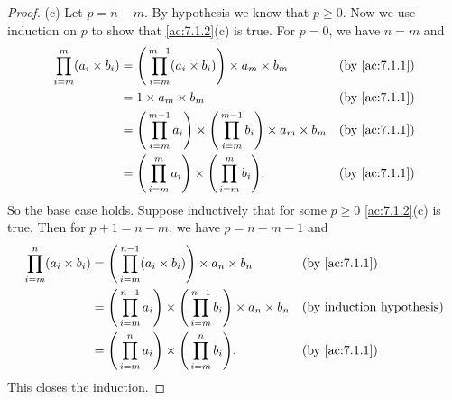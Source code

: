 \begin{proof}{(c)}
  Let \(p = n - m\).
  By hypothesis we know that \(p \geq 0\).
  Now we use induction on \(p\) to show that \cref{ac:7.1.2}(c) is true.
  For \(p = 0\), we have \(n = m\) and
  \begin{align*}
    \prod_{i = m}^m (a_i \times b_i) & = \Bigg(\prod_{i = m}^{m - 1} (a_i \times b_i)\Bigg) \times a_m \times b_m                                 &  & \text{(by \cref{ac:7.1.1})} \\
                                     & = 1 \times a_m \times b_m                                                                                  &  & \text{(by \cref{ac:7.1.1})} \\
                                     & = \Bigg(\prod_{i = m}^{m - 1} a_i\Bigg) \times \Bigg(\prod_{i = m}^{m - 1} b_i\Bigg) \times a_m \times b_m &  & \text{(by \cref{ac:7.1.1})} \\
                                     & = \Bigg(\prod_{i = m}^m a_i\Bigg) \times \Bigg(\prod_{i = m}^m b_i\Bigg).                                  &  & \text{(by \cref{ac:7.1.1})}
  \end{align*}
  So the base case holds.
  Suppose inductively that for some \(p \geq 0\) \cref{ac:7.1.2}(c) is true.
  Then for \(p + 1 = n - m\), we have \(p = n - m - 1\) and
  \begin{align*}
    \prod_{i = m}^n (a_i \times b_i) & = \Bigg(\prod_{i = m}^{n - 1} (a_i \times b_i)\Bigg) \times a_n \times b_n                                 &  & \text{(by \cref{ac:7.1.1})}      \\
                                     & = \Bigg(\prod_{i = m}^{n - 1} a_i\Bigg) \times \Bigg(\prod_{i = m}^{n - 1} b_i\Bigg) \times a_n \times b_n &  & \text{(by induction hypothesis)} \\
                                     & = \Bigg(\prod_{i = m}^n a_i\Bigg) \times \Bigg(\prod_{i = m}^n b_i\Bigg).                                  &  & \text{(by \cref{ac:7.1.1})}
  \end{align*}
  This closes the induction.
\end{proof}

